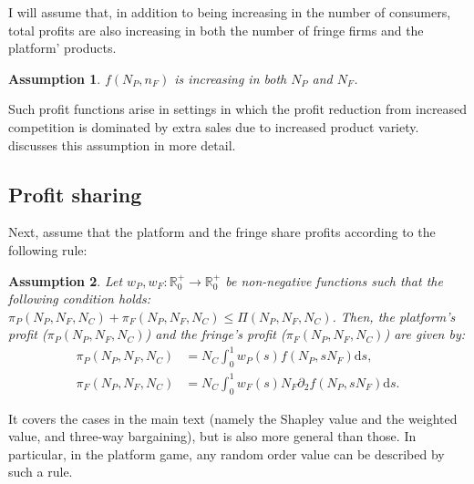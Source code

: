 \documentclass[a4paper]{article}
\newtheorem{assumption}{Assumption}
\newcommand{\ds}{\mathrm{d}s}
\begin{document}
I will assume that, in addition to being increasing in the number of consumers, total profits are also increasing in both the number of fringe firms and the platform' products.
\begin{assumption}
    \label{ass:monotone_profits}
    $f(N_P, n_F)$ is increasing in both $N_P$ and $N_F$.
\end{assumption}
Such profit functions arise in settings in which the profit reduction from increased competition is dominated by extra sales due to increased product variety.
 discusses this assumption in more detail.

\subsection{Profit sharing}
\label{sec:more_general_profit_sharing}
Next, assume that the platform and the fringe share profits according to the following rule:
\begin{assumption}
    \label{ass:profit_sharing}
    Let $w_P, w_F: \mathbb{R}^+_0 \to \mathbb{R}^+_0$ be non-negative functions such that the following condition holds: $\pi_P(N_P, N_F, N_C) + \pi_F(N_P, N_F, N_C) \leq \Pi(N_P, N_F, N_C)$.
    Then, the platform's profit ($\pi_P(N_P, N_F, N_C)$) and the fringe's profit ($\pi_F(N_P, N_F, N_C)$) are given by:
    \begin{align*}
        \pi_P(N_P, N_F, N_C) &= N_C \int_0^1 w_P(s) f(N_P, s N_F) \ds, \\
        \pi_F(N_P, N_F, N_C) &= N_C \int_0^1 w_F(s) N_F \partial_2 f(N_P, s N_F) \ds.
    \end{align*}
\end{assumption}
It covers the cases in the main text (namely the Shapley value and the weighted value, and three-way bargaining), but is also more general than those.
In particular, in the platform game, any random order value \parencite{weber1988probabilistic} can be described by such a rule.
\end{document}
